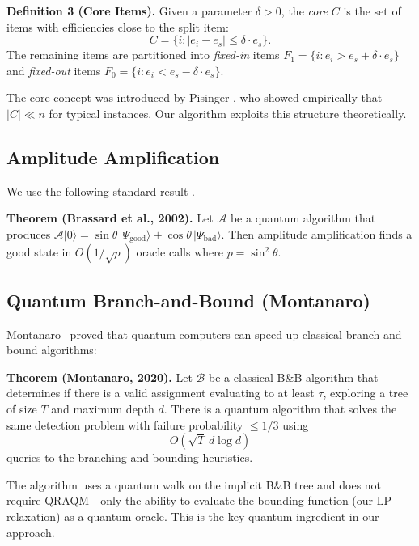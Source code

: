 \documentclass[conference]{IEEEtran}
\begin{document}
\textbf{Definition 3 (Core Items).} Given a parameter $\delta > 0$, the \textit{core} $C$ is the set of items with efficiencies close to the split item:
\begin{equation}
    C = \{i : |e_i - e_s| \leq \delta \cdot e_s\}.
    \label{eq:core}
\end{equation}
The remaining items are partitioned into \textit{fixed-in} items $F_1 = \{i : e_i > e_s + \delta \cdot e_s\}$ and \textit{fixed-out} items $F_0 = \{i : e_i < e_s - \delta \cdot e_s\}$.

The core concept was introduced by Pisinger \cite{ref4}, who showed empirically that $|C| \ll n$ for typical instances. Our algorithm exploits this structure theoretically.

\subsection{Amplitude Amplification}

We use the following standard result \cite{ref11}.

\textbf{Theorem (Brassard et al., 2002).} Let $\mathcal{A}$ be a quantum algorithm that produces $\mathcal{A}|0\rangle = \sin\theta\,|\Psi_{\text{good}}\rangle + \cos\theta\,|\Psi_{\text{bad}}\rangle$. Then amplitude amplification finds a good state in $O(1/\sqrt{p})$ oracle calls where $p = \sin^2\theta$.

\subsection{Quantum Branch-and-Bound (Montanaro)}

Montanaro~\cite{ref24} proved that quantum computers can speed up classical branch-and-bound algorithms:

\textbf{Theorem (Montanaro, 2020).} Let $\mathcal{B}$ be a classical B\&B algorithm that determines if there is a valid assignment evaluating to at least $\tau$, exploring a tree of size $T$ and maximum depth $d$. There is a quantum algorithm that solves the same detection problem with failure probability $\le 1/3$ using
\begin{equation}
    O(\sqrt{T}\, d \log d)
    \label{eq:montanaro}
\end{equation}
queries to the branching and bounding heuristics.

The algorithm uses a quantum walk on the implicit B\&B tree and does not require QRAQM---only the ability to evaluate the bounding function (our LP relaxation) as a quantum oracle. This is the key quantum ingredient in our approach.
\end{document}
